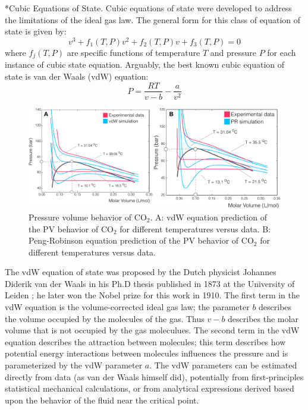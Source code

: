 \documentclass[11pt]{article}
\makeatletter
\theoremstyle{definition}
\renewcommand\subsubsection{\@startsection
	{subsubsection}{2}{0mm}
	{-0.05in}
	{-0.5\baselineskip}
	{\normalfont\normalsize\bfseries}}
\makeatother
\begin{document}
\subsubsection*{Cubic Equations of State.}
Cubic equations of state were developed to address the limitations of the ideal gas law.
The general form for this class of equation of state is given by:
\begin{equation}
v^{3}+f_{1}(T,P)v^2+f_{2}(T,P)v+f_{3}(T,P) = 0
\end{equation}
where $f_{j}(T,P)$ are specific functions of temperature $T$ and pressure $P$ for each instance of cubic state equation.
Arguably, the best known cubic equation of state is van der Waals (vdW) equation:
\begin{equation}
  \displaystyle P = \frac{RT}{v-b} - \frac{a}{v^2}
\end{equation}
\begin{figure}\center
  \includegraphics[width=1.0\textwidth]{./figs/Fig-CubicEOS.pdf}
  \caption{Pressure volume behavior of CO$_{\mathrm{2}}$.
	A: vdW equation prediction of the PV behavior of CO$_{\mathrm{2}}$ for different temperatures versus data.
	B: Peng-Robinson equation prediction of the PV behavior of CO$_{\mathrm{2}}$ for different temperatures versus data.}  \label{fig-cubic-eos}
\end{figure}

The vdW equation of state was proposed by the Dutch physicist Johannes Diderik van der Waals in his Ph.D thesis published in 1873 at the University of Leiden
\cite{vdW-Thesis}; he later won the Nobel prize for this work in 1910.
The first term in the vdW equation is the volume-corrected ideal gas law;
the parameter $b$ describes the volume occupied by the molecules of the gas. Thus $v-b$ describes the molar volume that is not occupied by the gas moleculues.
The second term in the vdW equation describes the attraction between molecules; this term describes how potential energy interactions between molecules influences the pressure
and is parameterized by the vdW parameter $a$.
The vdW parameters can be estimated directly from data (as van der Waals himself did), potentially from first-principles statistical mechanical calculations,
or from analytical expressions derived based upon the behavior of the fluid near the critical point.
\end{document}
